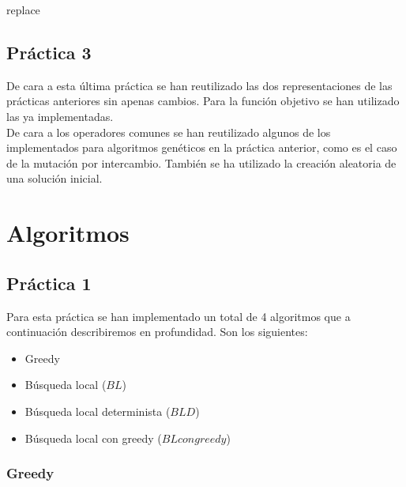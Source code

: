\documentclass[11pt,a4paper]{article}
\begin{document}
	\begin{algorithm}[H]
		\caption{replace}
	\end{algorithm}

	\subsection{Práctica 3} \label{sec33}
	
	De cara a esta última práctica se han reutilizado las dos representaciones de las prácticas anteriores sin apenas cambios. Para la función objetivo se han utilizado las ya implementadas. \\
	
	De cara a los operadores comunes se han reutilizado algunos de los implementados para algoritmos genéticos en la práctica anterior, como es el caso de la mutación por intercambio. También se ha utilizado la creación aleatoria de una solución inicial.

	\section{Algoritmos}
	
 	\subsection{Práctica 1}
	
	Para esta práctica se han implementado un total de 4 algoritmos que a continuación describiremos en profundidad. Son los siguientes:
	\begin{itemize}
		\item Greedy
		\item Búsqueda local ($BL$)
		\item Búsqueda local determinista ($BLD$)
		\item Búsqueda local con greedy ($BL con greedy$)
	\end{itemize}
		
	\subsubsection{Greedy}
	
\end{document}
